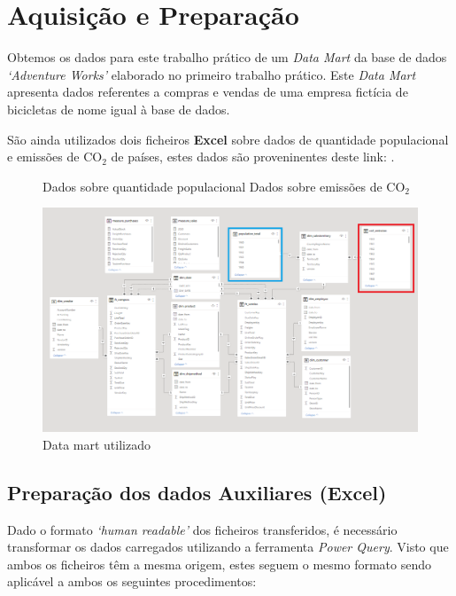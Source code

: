 \section*{Aquisição e Preparação}

Obtemos os dados para este trabalho prático de um \textit{Data Mart} da base de dados \newline\textit{`Adventure Works'} elaborado no primeiro trabalho prático. Este \textit{Data Mart} apresenta dados referentes a compras e vendas de uma empresa fictícia de bicicletas de nome igual à base de dados.

São ainda utilizados dois ficheiros \textbf{Excel} sobre dados de quantidade populacional e emissões de CO$_2$ de países, estes dados são proveninentes deste link:  \newline{}.  


\begin{figure}[H]
    \centering
    
    \tiny{
    \textcolor{blue}{\textbullet }{Dados sobre quantidade populacional}
    \textcolor{red}{\textbullet }{Dados sobre emissões de CO$_2$}
    }
    
    \includegraphics[scale=0.45]{images/DataMart.png}
    \caption{Data mart utilizado}
    \label{fig:my_label}
\end{figure}

\subsection{Preparação dos dados Auxiliares (Excel)}

Dado o formato \textit{`human readable'} dos ficheiros transferidos, é necessário transformar os dados carregados utilizando a ferramenta \textit{Power Query}. Visto que ambos os ficheiros têm a mesma origem, estes seguem o mesmo formato sendo aplicável a ambos os seguintes procedimentos:

